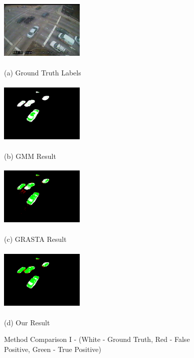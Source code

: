 \documentclass{article}
\begin{document}
\begin{figure}[t]
\centering
\begin{minipage}[b]{0.48\linewidth}
  \centering
  \centerline{\includegraphics[width=4cm, height=3cm]{Imgs/0112051333.jpg}}
  \centerline{(a) Ground Truth Labels}\medskip
\end{minipage}
\begin{minipage}[b]{0.48\linewidth}
  \centering
  \centerline{\includegraphics[width=4cm, height=3cm]{Imgs/0112051333_gmm_rwg.png}}
  \centerline{(b) GMM Result}\medskip
\end{minipage}

\begin{minipage}[b]{0.48\linewidth}
  \centering
  \centerline{\includegraphics[width=4cm, height =3cm]{Imgs/0112051333_grasta_rwg.png}}
  \centerline{(c) GRASTA Result}\medskip
\end{minipage}
\begin{minipage}[b]{0.48\linewidth}
  \centering
  \centerline{\includegraphics[width=4cm, height = 3cm]{Imgs/0112051333_rpca_rwg.png}}
  \centerline{(d) Our Result}\medskip
\end{minipage}

\caption{Method Comparison I - (White - Ground Truth, Red - False Positive, Green -  True Positive)}
\label{fig:methodComp1}
%
\end{figure}
\end{document}
